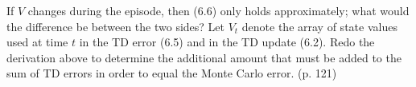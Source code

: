 
\begin{exercise}[Exercise 6.1]

If $V$ changes during the episode, then (6.6) only holds approximately;
what would the difference be between the two sides? Let $V_t$ denote the
array of state values used at time $t$ in the TD error (6.5) and in the
TD update (6.2). Redo the derivation above to determine the additional
amount that must be added to the sum of TD errors in order to equal the
Monte Carlo error. (p. 121)

\end{exercise}


\begin{solution}

\phantom{}

\end{solution}

